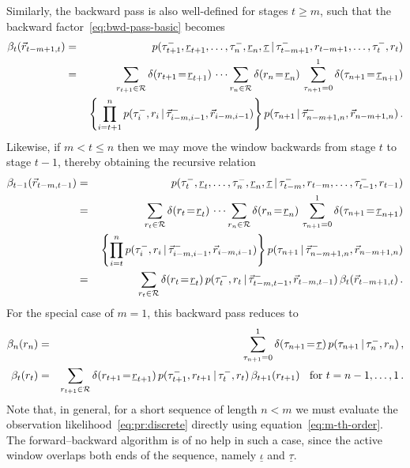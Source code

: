 \documentclass[a4paper]{article}
\newcommand{\ui}{\underline{\iota}}
\newcommand{\ut}{\underline{\tau}}
\newcommand{\ur}{\underline{r}}
\newcommand{\vr}{\vec{r}}
\newcommand{\tm}{\tau^{-}}
\begin{document}
Similarly, the backward pass is also well-defined for stages $t\ge m$, such that the backward factor~\eqref{eq:bwd-pass-basic} becomes
\begin{eqnarray}
\beta_t(\vr_{t-m+1,t}) & = & 
p(\tm_{t+1},\ur_{t+1},\ldots,\tm_n,\ur_n,\ut\,|\,\tm_{t-m+1},r_{t-m+1},\ldots,\tm_t,r_t)
\nonumber\\& = &
\sum_{r_{t+1}\in{\cal R}} \delta(r_{t+1}\!=\!\ur_{t+1})\,\cdots
\sum_{r_{n}\in{\cal R}} \delta(r_{n}\!=\!\ur_{n})\,
\sum_{\tau_{n+1}=0}^{1}\delta(\tau_{n+1}\!=\!\ut_{n+1})
\nonumber\\
&&{}
\left\{\prod_{i=t+1}^n
p(\tm_{i},r_{i}\,|\,\vec{\tau}^-_{i-m,i-1},\vr_{i-m,i-1})\right\}
p(\tau_{n+1}\,|\,\vec{\tau}^-_{n-m+1,n},\vr_{n-m+1,n})
\,.
\end{eqnarray}
Likewise, if $m<t\le n$ then we may move the window backwards from stage $t$ to stage $t-1$, thereby obtaining the recursive relation
\begin{eqnarray}
\beta_{t-1}(\vr_{t-m,t-1}) & = & 
p(\tm_{t},\ur_{t},\ldots,\tm_n,\ur_n,\ut\,|\,\tm_{t-m},r_{t-m},\ldots,\tm_{t-1},r_{t-1})
\nonumber\\& = &
\sum_{r_{t}\in{\cal R}} \delta(r_{t}\!=\!\ur_{t})\,\cdots
\sum_{r_{n}\in{\cal R}} \delta(r_{n}\!=\!\ur_{n})\,
\sum_{\tau_{n+1}=0}^{1}\delta(\tau_{n+1}\!=\!\ut_{n+1})
\nonumber\\
&&{}
\left\{\prod_{i=t}^n
p(\tm_{i},r_{i}\,|\,\vec{\tau}^-_{i-m,i-1},\vr_{i-m,i-1})\right\}
p(\tau_{n+1}\,|\,\vec{\tau}^-_{n-m+1,n},\vr_{n-m+1,n})
\nonumber\\& = &
\sum_{r_{t}\in{\cal R}} \delta(r_{t}\!=\!\ur_{t})\,
p(\tm_{t},r_{t}\,|\,\vec{\tau}^-_{t-m,t-1},\vr_{t-m,t-1})\,\beta_{t}(\vr_{t-m+1,t})
\,.
\end{eqnarray}
For the special case of $m=1$, this backward pass reduces to
\begin{eqnarray}
\beta_n(r_n) & = &  \sum_{\tau_{n+1}=0}^{1}\delta(\tau_{n+1}\!=\!\ut)\,
p(\tau_{n+1}\,|\,\tm_n,r_n)\,,
\nonumber\\
\beta_{t}(r_{t}) & = &
\sum_{r_{t+1}\in{\cal R}} \delta(r_{t+1}\!=\!\ur_{t+1})\,
p(\tm_{t+1},r_{t+1}\,|\,\tm_{t},r_{t})
\,\beta_{t+1}(r_{t+1})\hspace*{2mm}\mbox{ for $t=n-1,\ldots,1$}
\,.
\end{eqnarray}
Note that, in general, for a short sequence of length $n<m$ we must evaluate the observation likelihood~\eqref{eq:pr:discrete} directly using
equation~\eqref{eq:m-th-order}. The forward--backward algorithm is of no help in such a case, since the active window overlaps
both ends of the sequence, namely $\ui$ and $\ut$.
\end{document}
